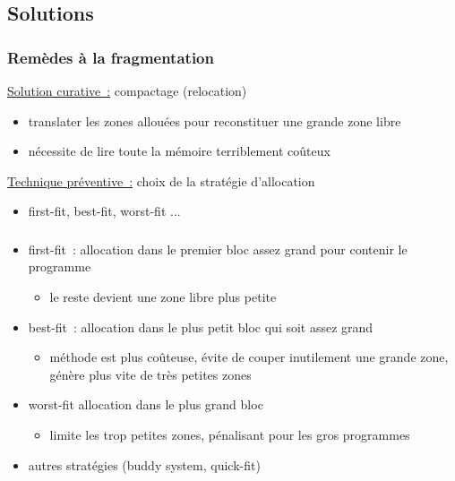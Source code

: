  \subsection{Solutions}
\begin{frame}
  \frametitle{Remèdes à la fragmentation}
  \underline{Solution curative~:} \alert{compactage} (relocation)
  \begin{itemize}
  \item \alert{translater} les zones allouées pour reconstituer une grande zone libre   
  \item nécessite de lire toute la mémoire  terriblement coûteux 
  \end{itemize}
  
  \vspace{0.5cm}
  \underline{Technique préventive~:} choix de la stratégie d'allocation
    \begin{itemize}
    \item first-fit, best-fit, worst-fit ...
    \end{itemize}
\end{frame}

\begin{frame}
  \frametitle{\insertsubsection}
  \begin{itemize}
  \item \alert{first-fit}~: allocation dans le premier bloc assez grand pour contenir
    le programme
    \begin{itemize}
    \item le reste devient une zone libre plus petite
    \end{itemize}
  \item \alert{best-fit}~: allocation dans le plus petit bloc qui soit assez grand
    \begin{itemize}
    \item méthode est plus coûteuse, évite de couper inutilement une grande zone,
      génère plus vite de très petites zones
    \end{itemize}
  \item \alert{worst-fit} allocation dans le plus grand bloc
    \begin{itemize}
    \item limite les trop petites zones, pénalisant pour les gros programmes
    \end{itemize}
  \item autres stratégies (buddy system, quick-fit)
  \end{itemize}
\end{frame}

